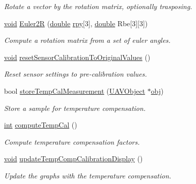 \begin{DoxyCompactItemize}
\begin{DoxyCompactList}\small\item\em Rotate a vector by the rotation matrix, optionally trasposing. \end{DoxyCompactList}\item 
\hyperlink{group___u_a_v_objects_plugin_ga444cf2ff3f0ecbe028adce838d373f5c}{void} \hyperlink{class_calibration_a377eb05dfcb626f7b5af01ea1647d9ae}{Euler2\-R} (\hyperlink{_super_l_u_support_8h_a8956b2b9f49bf918deed98379d159ca7}{double} \hyperlink{analyze_i_n_s_g_p_s_8m_af77d7cf399487c276b3c52470c348370}{rpy}\mbox{[}3\mbox{]}, \hyperlink{_super_l_u_support_8h_a8956b2b9f49bf918deed98379d159ca7}{double} Rbe\mbox{[}3\mbox{]}\mbox{[}3\mbox{]})
\begin{DoxyCompactList}\small\item\em Compute a rotation matrix from a set of euler angles. \end{DoxyCompactList}\item 
\hyperlink{group___u_a_v_objects_plugin_ga444cf2ff3f0ecbe028adce838d373f5c}{void} \hyperlink{class_calibration_afb4b17903974c7e7142cb5e65d29c967}{reset\-Sensor\-Calibration\-To\-Original\-Values} ()
\begin{DoxyCompactList}\small\item\em Reset sensor settings to pre-\/calibration values. \end{DoxyCompactList}\item 
bool \hyperlink{class_calibration_a08dbde1fd3231dc4ec7f6a6132adcc80}{store\-Temp\-Cal\-Measurement} (\hyperlink{class_u_a_v_object}{U\-A\-V\-Object} $\ast$\hyperlink{glext_8h_a0c0d4701a6c89f4f7f0640715d27ab26}{obj})
\begin{DoxyCompactList}\small\item\em Store a sample for temperature compensation. \end{DoxyCompactList}\item 
\hyperlink{ioapi_8h_a787fa3cf048117ba7123753c1e74fcd6}{int} \hyperlink{class_calibration_a00f7ee1317e4c7b92b8c60a5f513698d}{compute\-Temp\-Cal} ()
\begin{DoxyCompactList}\small\item\em Compute temperature compensation factors. \end{DoxyCompactList}\item 
\hyperlink{group___u_a_v_objects_plugin_ga444cf2ff3f0ecbe028adce838d373f5c}{void} \hyperlink{class_calibration_aa6f828b26cfbaecba7ebb8f1ab90fea4}{update\-Temp\-Comp\-Calibration\-Display} ()
\begin{DoxyCompactList}\small\item\em Update the graphs with the temperature compensation. \end{DoxyCompactList}\end{DoxyCompactItemize}
